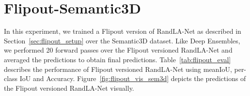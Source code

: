     \section{Flipout-Semantic3D}
    In this experiment, we trained a Flipout version of RandLA-Net as described in Section~\ref{sec:flipout_setup} over the Semantic3D dataset.
    Like Deep Ensembles, we performed 20 forward passes over the Flipout versioned RandLA-Net and averaged the predictions to obtain final predictions.
    Table~\ref{tab:flipout_eval} describes the performance of Flipout versioned RandLA-Net using meanIoU, per-class IoU and Accuracy.
    Figure~\ref{fig:flipout_vis_sem3d} depicts the predictions of the Flipout versioned RandLA-Net visually.
    \begin{table}[h!]
        \caption{Illustration of performance of Flipout versioned RandLA-Net on Semantic3D dataset. meanIOU, IOU per-class and overall accuracy are represented here.
        C1 to C8 are the classes of Semantic3D which are Manmadeterrain, Naturalterrain, Highvegetation, Lowvegetation, Buildings, Hardscapes, Scanningartifacts, and Cars.}
        \label{tab:flipout_eval}
    \end{table}
